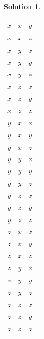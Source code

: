 \documentclass[UTF8,10pt,a4paper]{article}
\theoremstyle{Problem}
\theoremstyle{Solution}
\newtheorem*{sol}{Solution}
\begin{document}
\begin{sol}
\begin{table}[h]
\begin{tabular}{|c|c|c|}
        $x$ & $x$ & $y$ \\ \hline
        $x$ & $x$ & $z$ \\ \hline
        $x$ & $y$ & $x$ \\ \hline
        $x$ & $y$ & $y$ \\ \hline
        $x$ & $y$ & $z$ \\ \hline
        $x$ & $z$ & $x$ \\ \hline
        $x$ & $z$ & $y$ \\ \hline
        $x$ & $z$ & $z$ \\ \hline
        $y$ & $x$ & $x$ \\ \hline
        $y$ & $x$ & $y$ \\ \hline
        $y$ & $x$ & $z$ \\ \hline
        $y$ & $y$ & $x$ \\ \hline
        $y$ & $y$ & $y$ \\ \hline
        $y$ & $y$ & $z$ \\ \hline
        $y$ & $z$ & $x$ \\ \hline
        $y$ & $z$ & $y$ \\ \hline
        $y$ & $z$ & $z$ \\ \hline
        $z$ & $x$ & $x$ \\ \hline
        $z$ & $x$ & $y$ \\ \hline
        $z$ & $x$ & $z$ \\ \hline
        $z$ & $y$ & $x$ \\ \hline
        $z$ & $y$ & $y$ \\ \hline
        $z$ & $y$ & $z$ \\ \hline
        $z$ & $z$ & $x$ \\ \hline
        $z$ & $z$ & $y$ \\ \hline
        $z$ & $z$ & $z$ \\ \hline
        \end{tabular}
        \end{table}


\end{sol}
\end{document}
